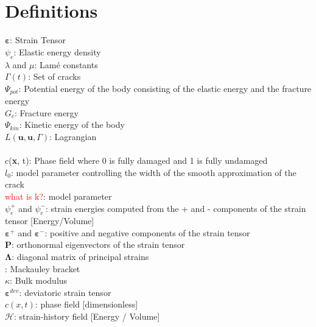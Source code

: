 \documentclass[12pt,3p]{article}
\numberwithin{equation}{section}
\begin{document}
\section{Definitions}
$\boldsymbol{\varepsilon}$: Strain Tensor  \\
$\psi_{e}$: Elastic energy density  \\
$\lambda$ and $\mu$:  Lamé constants \\
$\Gamma (t)$: Set of cracks \\ 
$\Psi_{p o t}$: Potential energy of the body consisting of the elastic energy and the fracture energy  \\
$G_c$: Fracture energy  \\
$\Psi_{k i n}$: Kinetic energy of the body  \\
$L(\boldsymbol{u}, \boldsymbol{u}, \Gamma)$: Lagrangian \\ \\
c(\textbf{x}, t): Phase field where 0 is fully damaged and 1 is fully undamaged  \\
$l_0$: model parameter controlling the width of the smooth approximation of the crack \\
\textcolor{red}{what is k?}: model parameter  \\
$\psi_{e}^{+}$ and $\psi_{e}^{-}$: strain energies computed from the + and - components of the strain tensor [Energy/Volume] \\
$\boldsymbol{\varepsilon}^{+}$ and $\boldsymbol{\varepsilon}^{-}$: positive and negative components of the strain tensor \\
$\mathbf{P}$: orthonormal eigenvectors of the strain tensor \\
$\boldsymbol{\Lambda}$: diagonal matrix of principal strains \\
$ $: Mackauley bracket \\
$\kappa$: Bulk modulus \\
$\boldsymbol{\varepsilon}^{d e v}$: deviatoric strain tensor \\
$c (x,t)$: phase field [dimensionless] \\
$\mathcal{H}$: strain-history field [Energy / Volume]

\end{document}
